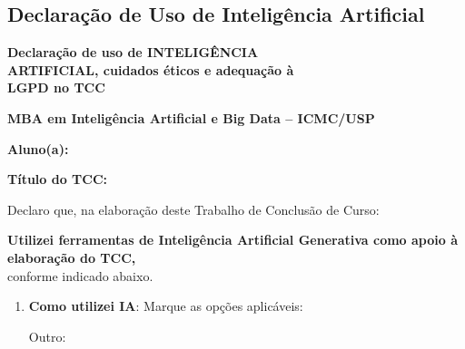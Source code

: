 \begin{anexosenv}
\partanexos

\chapter{Declaração de Uso de Inteligência Artificial}
\label{anexo:declaracao_ia}

\vspace*{0.22cm}
\begin{center}
{\bfseries\fontsize{15}{16}\selectfont
Declaração de uso de INTELIGÊNCIA\\
ARTIFICIAL, cuidados éticos e adequação à\\
LGPD no TCC\par}
\vspace{0.65cm}
{\bfseries\large MBA em Inteligência Artificial e Big Data -- ICMC/USP}
\end{center}

\vspace{0.25cm}
\textbf{Aluno(a):} \imprimirautor

\vspace{0.48cm}
\textbf{Título do TCC:} \imprimirtitulo

\vspace{1.0cm}
Declaro que, na elaboração deste Trabalho de Conclusão de Curso:

\vspace{0.45cm}

\vspace{0.35cm}
\noindent\checkedbox\hspace{0.12cm}\textbf{Utilizei ferramentas de Inteligência Artificial Generativa como apoio à elaboração do TCC,}\\
\hspace*{0.35cm}conforme indicado abaixo.


\begin{enumerate}
\item \textbf{Como utilizei IA}: Marque as opções aplicáveis:

\vspace{0.32cm}
\vspace{0.24cm}
\vspace{0.24cm}
\vspace{0.24cm}
\vspace{0.24cm}
\vspace{0.24cm}
\vspace{0.24cm}
\noindent\checkbox\hspace{0.12cm}Outro: \formline{10.95cm}


\end{enumerate}
\end{anexosenv}
